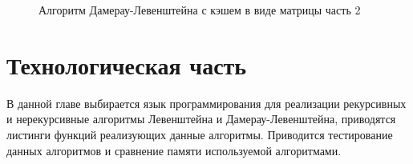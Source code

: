 \documentclass[12pt]{report}
\begin{document}
\begin{figure}[h!]
\caption{Алгоритм Дамерау-Левенштейна с кэшем в виде матрицы часть 2}
\end{figure}
\chapter{Технологическая часть}
В данной главе выбирается язык программирования для реализации рекурсивных и нерекурсивные алгоритмы Левенштейна и Дамерау-Левенштейна, приводятся листинги функций реализующих данные алгоритмы. Приводится тестирование данных алгоритмов и сравнение памяти используемой алгоритмами.
\end{document}
